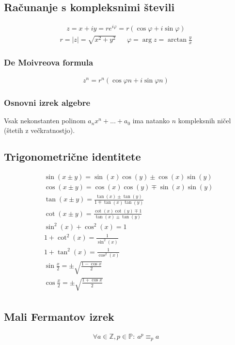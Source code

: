 	\subsection*{Računanje s kompleksnimi števili}
	\begin{gather*}
		z = x + iy = r e^{i\varphi} = r\left( \cos \varphi + i \sin \varphi \right)
	\end{gather*}
	\begin{align*}
		r = |z| = \sqrt{x^2 + y^2} && \varphi = \arg z = \arctan \frac{y}{x}
	\end{align*}

	\subsubsection*{De Moivreova formula}
	\begin{align*}
		z^n = r^n\left( \cos \varphi n + i \sin \varphi n \right)
	\end{align*}

	\subsubsection*{Osnovni izrek algebre}
	Vsak nekonstanten polinom $a_n x^n + \dots + a_0$ ima natanko $n$ kompleksnih ničel (štetih z večkratnostjo).

	\subsection*{Trigonometrične identitete}
	\begin{align*}
		&\sin(x \pm y) = \sin(x) \cos(y) \pm \cos(x) \sin(y) \\
		&\cos(x \pm y) = \cos(x) \cos(y) \mp \sin(x) \sin(y)\\
		&\tan(x \pm y) = \frac{\tan(x)\pm \tan(y)}{1 \mp \tan(x) \tan(y)}\\
		&\cot(x \pm y) = \frac{\cot(x)\cot(y) \mp 1}{\tan(x) \pm \tan(y)}\\
		&\sin^2(x)+\cos^2(x) = 1\\
		&1+\cot^2(x) = \frac{1}{\sin^2(x)}\\
		&1+\tan^2(x) = \frac{1}{\cos^2(x)}\\
		&\sin\frac{x}{2} = \pm\sqrt{\frac{1-\cos x}{2}}\\
		&\cos\frac{x}{2} = \pm\sqrt{\frac{1+\cos x}{2}}\\
	\end{align*}

	\subsection*{Mali Fermantov izrek}
	\begin{align*}
		\forall a \in \mathbb{Z}, p \in \mathbb{P}:\ a^p \equiv_p a
	\end{align*}

